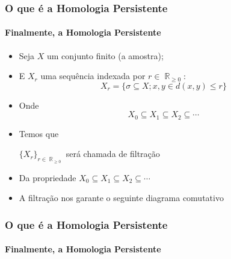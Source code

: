 \documentclass[11pt]{beamer}
\DeclareMathOperator{\R}{\mathbb{R}}
\theoremstyle{remark}
\theoremstyle{definition}
\theoremstyle{plain}
\begin{document}
    \begin{frame}
        \frametitle{O que é a Homologia Persistente}
        \framesubtitle{Finalmente, a Homologia Persistente}

        \begin{itemize}
            \item
                Seja $X$ um conjunto finito (a amostra);

            \item
                E $X_r$ uma sequência indexada por $r \in \R_{\geq 0}$:
                \begin{equation*}
                    X_r = \{\sigma \subseteq X; x,y \in d(x,y) \leq r\}
                \end{equation*}

            \item Onde 
                \begin{equation*}
                    X_0 \subseteq X_1 \subseteq X_2 \subseteq \cdots
                \end{equation*}

            \item
                Temos que
                \begin{center}
                    $\{X_r\}_{r \in \R_{\geq 0}}$ será chamada de filtração\\[0.5cm]
                \end{center}

            \item 
                Da propriedade 
                $X_0 \subseteq X_1 \subseteq X_2 \subseteq \cdots$

            \item 
                A filtração nos garante o seguinte diagrama comutativo
        \end{itemize}
        
    \end{frame}

    \begin{frame}
        \frametitle{O que é a Homologia Persistente}
        \framesubtitle{Finalmente, a Homologia Persistente}
        
    \end{frame}
\end{document}
